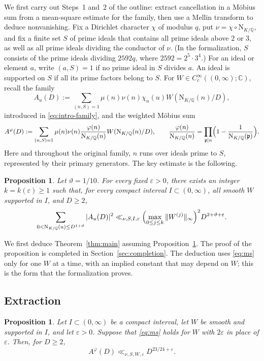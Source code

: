 \documentclass[11pt,a4paper]{article}
\numberwithin{equation}{section}
\numberwithin{figure}{section}
\newtheorem{proposition}[theorem]{Proposition}
\theoremstyle{definition}
\theoremstyle{remark}
\newcommand{\Q}{\mathbb Q}
\newcommand{\NK}{\mathrm N_{K/\Q}}
\begin{document}
We first carry out Steps~1 and~2 of the outline: extract
cancellation in a M\"obius sum from a mean-square estimate for the family,
then use a Mellin transform to deduce nonvanishing.
Fix a Dirichlet character $\chi$ of modulus $q$, put $\nu=\chi\circ\NK$, and fix a finite set $S$
of prime ideals that contains all prime ideals above $2$ or $3$, as
well as all prime ideals dividing the conductor of $\nu$.
(In the formalization, $S$ consists of the prime ideals dividing $2592q$, where $2592=2^5\cdot3^4$.)
For an ideal or element $a$, write $(a,S)=1$ if no prime ideal in $S$
divides $a$.
An ideal is supported on $S$ if all its prime factors belong to $S$.
For $W\in C_c^\infty((0,\infty);\mathbb C)$, recall the family
\[
 A_u(D):=\sum_{(n,S)=1}\mu(n)\nu(n)\chi_n(u)W(\NK(n)/D),
\]
introduced in \eqref{eq:intro-family}, and the weighted M\"obius sum
\begin{equation}\label{eq:A-phi}
 A^\varphi(D):=\sum_{(n,S)=1}\mu(n)\nu(n)\frac{\varphi(n)}{\NK(n)}W(\NK(n)/D),
 \qquad
 \frac{\varphi(n)}{\NK(n)}=\prod_{\mathfrak p\mid n}\Bigl(1-\frac1{\NK(\mathfrak p)}\Bigr).
\end{equation}
Here and throughout the
original family, $n$ runs over ideals prime to $S$, represented by
their primary generators. The key estimate is the following.

\begin{proposition}\label{thm:ms}
Let $\vartheta=1/10$. For every fixed $\varepsilon>0$, there exists an integer $k=k(\varepsilon)\ge1$
such that, for every compact interval $I\subset(0,\infty)$,
all smooth $W$ supported in $I$, and $D\ge2$,
\begin{equation}\label{eq:ms}
 \sum_{0<\NK(u)\le D^{1+\vartheta}}|A_u(D)|^2
       \ll_{\nu,S,I,\varepsilon}
       \Bigl(\max_{0\le j\le k}\|W^{(j)}\|_\infty\Bigr)^2
       D^{2+\vartheta+\varepsilon}.
\end{equation}
\end{proposition}

We first deduce Theorem~\ref{thm:main} assuming Proposition~\ref{thm:ms}.
The proof of the proposition is completed in Section~\ref{sec:completion}.
The deduction uses \eqref{eq:ms} only for one $W$ at a time, with an implied constant that may
depend on $W$; this is the form that the formalization proves.

\subsection{Extraction}
\begin{proposition}\label{prop:extraction}
Let $I\subset(0,\infty)$ be a compact interval, let $W$ be smooth and supported in $I$, and let
$\varepsilon>0$. Suppose that \eqref{eq:ms} holds for $W$ with $2\varepsilon$ in place of
$\varepsilon$. Then, for $D\ge2$,
\begin{equation}\label{eq:mobius-saving}
 A^\varphi(D)\ll_{\nu,S,W,\varepsilon}D^{23/24+\varepsilon}.
\end{equation}
\end{proposition}
\end{document}
